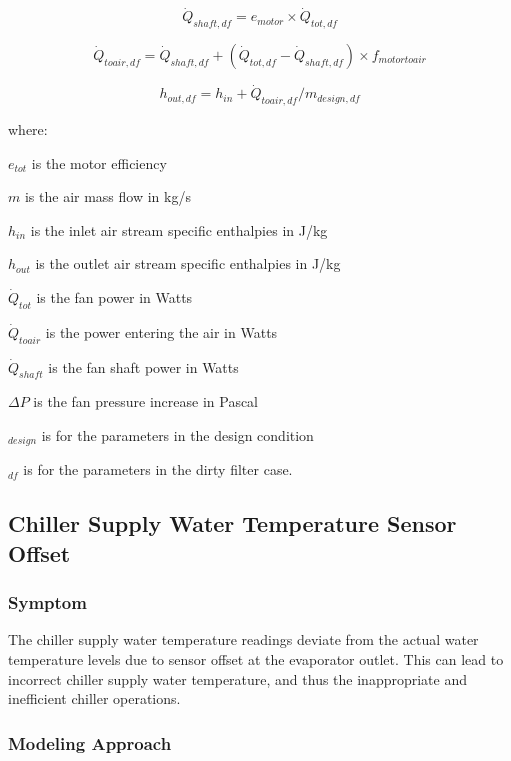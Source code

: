 \begin{equation}
\dot{Q}_{shaft,df} = e_{motor} \times \dot{Q}_{tot, df}
\end{equation}

\begin{equation}
\dot{Q}_{toair,df} = \dot{Q}_{shaft,df} +( \dot{Q}_{tot,df} - \dot{Q}_{shaft,df}) \times f_{motortoair}
\end{equation}

\begin{equation}
h_{out,df} = h_{in} + \dot{Q}_{toair,df} / m_{design,df}
\end{equation}

where:

\(e_{tot}\) is the motor efficiency

\(m\) is the air mass flow in kg/s

\(h_{in}\) is the inlet air stream specific enthalpies in J/kg

\(h_{out}\) is the outlet air stream specific enthalpies in J/kg

\(\dot{Q}_{tot}\) is the fan power in Watts

\(\dot{Q}_{toair}\) is the power entering the air in Watts

\(\dot{Q}_{shaft}\) is the fan shaft power in Watts

\(\Delta P\) is the fan pressure increase in Pascal

\(_{design}\) is for the parameters in the design condition

\(_{df}\) is for the parameters in the dirty filter case.


\subsection{Chiller Supply Water Temperature Sensor Offset}\label{chiller-supply-water-temperature-sensor-offset}

\subsubsection{Symptom}

The chiller supply water temperature readings deviate from the actual water temperature levels due to sensor offset at the evaporator outlet. This can lead to incorrect chiller supply water temperature, and thus the inappropriate and inefficient chiller operations.

\subsubsection{Modeling Approach}

